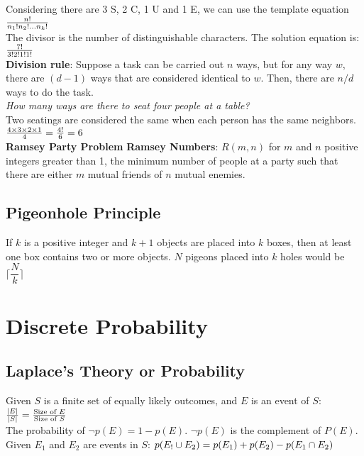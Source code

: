 \documentclass[letter]{article}
\begin{document}
\begin{multicols}{2}
  Considering there are 3 S, 2 C, 1 U and 1 E, we can use the template equation
  $\\\frac{n!}{n_1!n_2! \ldots n_k!}$\\
  The divisor is the number of distinguishable characters. The solution equation
  is:
  $\\\frac{7!}{3!2!1!1!}$\\
  \textbf{Division rule}: Suppose a task can be carried out $n$ ways, but for
  any way $w$, there are $(d - 1)$ ways that are considered identical to $w$.
  Then, there are $n/d$ ways to do the task. \\
  \textit{How many ways are there to seat four people at a table?} \\
  Two seatings are considered the same when each person has the same neighbors.
  $\\\frac{4 \times 3 \times 2 \times 1}{4} = \frac{4!}{6} = 6$\\
  \textbf{Ramsey Party Problem}
  \textbf{Ramsey Numbers}: $R(m, n)$ for $m$ and $n$ positive integers greater
  than 1, the minimum number of people at a party such that there are either $m$
  mutual friends of $n$ mutual enemies.

  \subsection{Pigeonhole Principle} 
  If $k$ is a positive integer and $k + 1$ objects are placed into $k$ boxes,
  then at least one box contains two or more objects. $N$ pigeons placed into
  $k$ holes would be
  $\lceil\dfrac{N}{k}\rceil$

  \section{Discrete Probability} 

  \subsection{Laplace's Theory or Probability} 
  Given $S$ is a finite set of equally likely outcomes, and $E$ is an event of
  $S$:
  $\\\frac{|E|}{|S|} = \frac{\text{Size of } E}{\text{Size of } S}$\\
  The probability of $\neg p(E) = 1 - p(E)$. $\neg p(E)$ is the complement of
  $P(E)$. \\
  Given $E_1$ and $E_2$ are events in $S$:
  $\\p(E_! \cup E_2) = p(E_1) + p(E_2) - p(E_1 \cap E_2)$


\end{multicols}
\end{document}
